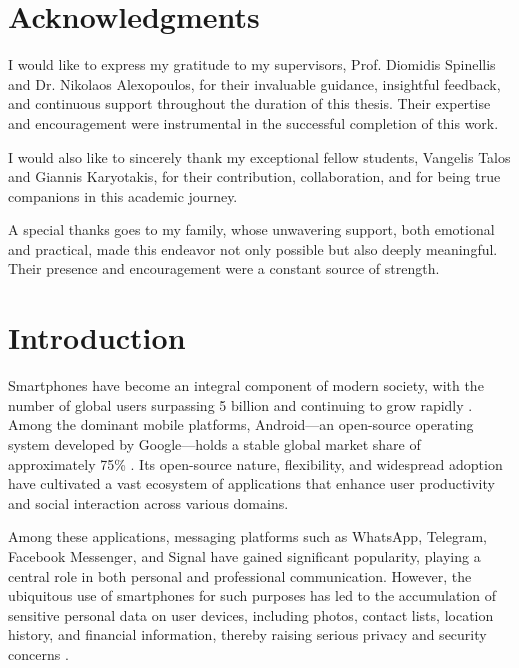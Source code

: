 \documentclass[a4paper,12pt]{report}
\begin{document}
\chapter*{Acknowledgments}

I would like to express my gratitude to my supervisors, Prof. Diomidis Spinellis and Dr. Nikolaos Alexopoulos, for their invaluable guidance, insightful feedback, and continuous support throughout the duration of this thesis. Their expertise and encouragement were instrumental in the successful completion of this work.

I would also like to sincerely thank my exceptional fellow students, Vangelis Talos and Giannis Karyotakis, for their contribution, collaboration, and for being true companions in this academic journey.

A special thanks goes to my family, whose unwavering support, both emotional and practical, made this endeavor not only possible but also deeply meaningful. Their presence and encouragement were a constant source of strength.
\clearpage

\tableofcontents
\clearpage

\chapter{Introduction}

Smartphones have become an integral component of modern society, with the number of global users surpassing 5 billion and continuing to grow rapidly \cite{statista2024smartphone}. Among the dominant mobile platforms, Android—an open-source operating system developed by Google—holds a stable global market share of approximately 75\% \cite{statista2021android}. Its open-source nature, flexibility, and widespread adoption have cultivated a vast ecosystem of applications that enhance user productivity and social interaction across various domains.

Among these applications, messaging platforms such as WhatsApp, Telegram, Facebook Messenger, and Signal have gained significant popularity, playing a central role in both personal and professional communication. However, the ubiquitous use of smartphones for such purposes has led to the accumulation of sensitive personal data on user devices, including photos, contact lists, location history, and financial information, thereby raising serious privacy and security concerns \cite{verge2018facebooksms}.
\end{document}

